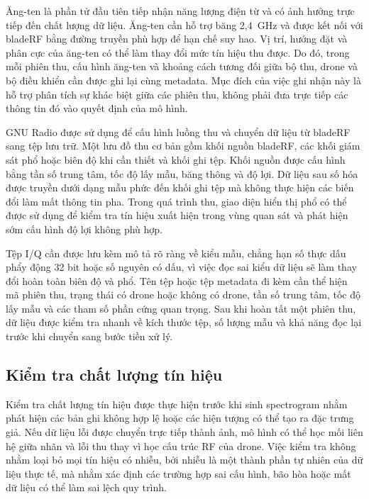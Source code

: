 \documentclass[../DoAn.tex]{subfiles}
\begin{document}
Ăng-ten là phần tử đầu tiên tiếp nhận năng lượng điện từ và có ảnh hưởng trực tiếp đến chất lượng dữ liệu. Ăng-ten cần hỗ trợ băng 2,4~GHz và được kết nối với bladeRF bằng đường truyền phù hợp để hạn chế suy hao. Vị trí, hướng đặt và phân cực của ăng-ten có thể làm thay đổi mức tín hiệu thu được. Do đó, trong mỗi phiên thu, cấu hình ăng-ten và khoảng cách tương đối giữa bộ thu, drone và bộ điều khiển cần được ghi lại cùng metadata. Mục đích của việc ghi nhận này là hỗ trợ phân tích sự khác biệt giữa các phiên thu, không phải đưa trực tiếp các thông tin đó vào quyết định của mô hình.

GNU Radio được sử dụng để cấu hình luồng thu và chuyển dữ liệu từ bladeRF sang tệp lưu trữ. Một lưu đồ thu cơ bản gồm khối nguồn bladeRF, các khối giám sát phổ hoặc biên độ khi cần thiết và khối ghi tệp. Khối nguồn được cấu hình bằng tần số trung tâm, tốc độ lấy mẫu, băng thông và độ lợi. Dữ liệu sau số hóa được truyền dưới dạng mẫu phức đến khối ghi tệp mà không thực hiện các biến đổi làm mất thông tin pha. Trong quá trình thu, giao diện hiển thị phổ có thể được sử dụng để kiểm tra tín hiệu xuất hiện trong vùng quan sát và phát hiện sớm cấu hình độ lợi không phù hợp.


Tệp I/Q cần được lưu kèm mô tả rõ ràng về kiểu mẫu, chẳng hạn số thực dấu phẩy động 32 bit hoặc số nguyên có dấu, vì việc đọc sai kiểu dữ liệu sẽ làm thay đổi hoàn toàn biên độ và phổ. Tên tệp hoặc tệp metadata đi kèm cần thể hiện mã phiên thu, trạng thái có drone hoặc không có drone, tần số trung tâm, tốc độ lấy mẫu và các tham số phần cứng quan trọng. Sau khi hoàn tất một phiên thu, dữ liệu được kiểm tra nhanh về kích thước tệp, số lượng mẫu và khả năng đọc lại trước khi chuyển sang bước tiền xử lý.

\subsection{Kiểm tra chất lượng tín hiệu}

Kiểm tra chất lượng tín hiệu được thực hiện trước khi sinh spectrogram nhằm phát hiện các bản ghi không hợp lệ hoặc các hiện tượng có thể tạo ra đặc trưng giả. Nếu dữ liệu lỗi được chuyển trực tiếp thành ảnh, mô hình có thể học mối liên hệ giữa nhãn và lỗi thu thay vì học cấu trúc RF của drone. Việc kiểm tra không nhằm loại bỏ mọi tín hiệu có nhiễu, bởi nhiễu là một thành phần tự nhiên của dữ liệu thực tế, mà nhằm xác định các trường hợp sai cấu hình, bão hòa hoặc mất dữ liệu có thể làm sai lệch quy trình.
\end{document}

